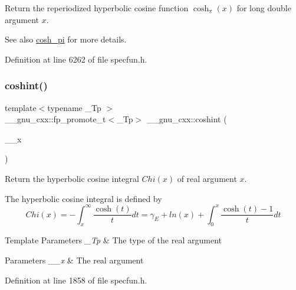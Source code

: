 Return the reperiodized hyperbolic cosine function $ \cosh_\pi(x) $ for {\ttfamily long double} argument $ x $.

\begin{DoxySeeAlso}{See also}
\hyperlink{group__gnu__math__spec__func_gaf59c68a01adfdab0f22c4fb405ab2a36}{cosh\+\_\+pi} for more details. 
\end{DoxySeeAlso}


Definition at line 6262 of file specfun.\+h.

\mbox{\label{group__gnu__math__spec__func_ga2411d513d418180285ace6650c7b7e31}} 
\subsubsection{\texorpdfstring{coshint()}{coshint()}}
{\footnotesize\ttfamily template$<$typename \+\_\+\+Tp $>$ \\
\+\_\+\+\_\+gnu\+\_\+cxx\+::fp\+\_\+promote\+\_\+t$<$\+\_\+\+Tp$>$ \+\_\+\+\_\+gnu\+\_\+cxx\+::coshint (\begin{DoxyParamCaption}\item[{\+\_\+\+Tp}]{\+\_\+\+\_\+x }\end{DoxyParamCaption})\hspace{0.3cm}{\ttfamily [inline]}}

Return the hyperbolic cosine integral $ Chi(x) $ of real argument $ x $.

The hyperbolic cosine integral is defined by \[ Chi(x) = -\int_x^\infty \frac{\cosh(t)}{t}dt = \gamma_E + ln(x) + \int_0^x \frac{\cosh(t)-1}{t}dt \]


\begin{DoxyTemplParams}{Template Parameters}
{\em \+\_\+\+Tp} & The type of the real argument \\
\hline
\end{DoxyTemplParams}

\begin{DoxyParams}{Parameters}
{\em \+\_\+\+\_\+x} & The real argument \\
\hline
\end{DoxyParams}


Definition at line 1858 of file specfun.\+h.

